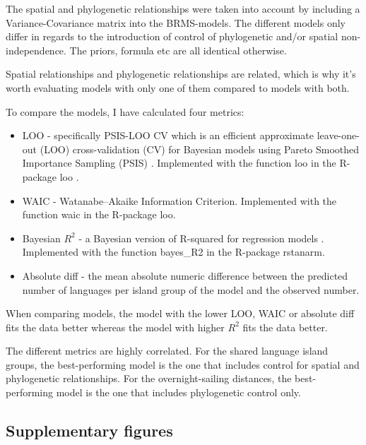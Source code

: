 \documentclass[unnumsec,webpdf,modern,medium]{oup-authoring-template}
\begin{document}
The spatial and phylogenetic relationships were taken into account by including a Variance-Covariance matrix into the BRMS-models. The different models only differ in regards to the introduction of control of phylogenetic and/or spatial non-independence. The priors, formula etc are all identical otherwise.

Spatial relationships and phylogenetic relationships are related, which is why it's worth evaluating models with only one of them compared to models with both.

To compare the models, I have calculated four metrics:

\begin{itemize}
    \item LOO - specifically PSIS-LOO CV which is an efficient approximate leave-one-out (LOO) cross-validation (CV) for Bayesian models using Pareto Smoothed Importance Sampling (PSIS) . Implemented with the function loo in the R-package loo \citep{R-loo, loo2017a, loo2017b}.
    \item WAIC - Watanabe–Akaike Information Criterion. Implemented with the function waic in the R-package loo.
    \item Bayesian $R^2$ - a Bayesian version of R-squared for regression models \citep{R-brms, brms2017, brms2018, brms2021}. Implemented with the function bayes\_R2 in the R-package rstanarm.
    \item Absolute diff - the mean absolute numeric difference between the predicted number of languages per island group of the model and the observed number.
\end{itemize}

When comparing models, the model with the lower LOO, WAIC or absolute diff fits the data better whereas the model with higher $R^2$ fits the data better. 





The different metrics are highly correlated. For the shared language island groups, the best-performing model is the one that includes control for spatial and phylogenetic relationships. For the overnight-sailing distances, the best-performing model is the one that includes phylogenetic control only.

\newpage
\subsection{Supplementary figures}
\label{appendix_supp_figs}
\end{document}
